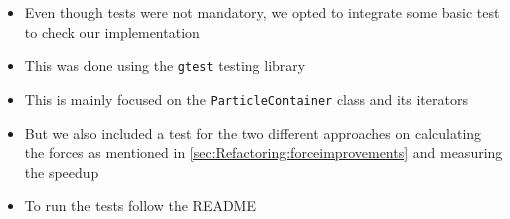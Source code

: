 \documentclass{article}
\begin{document}
\begin{itemize}
    \item Even though tests were not mandatory, we opted to integrate some basic test to check our implementation
    \item This was done using the \verb|gtest| testing library
    \item This is mainly focused on the \verb|ParticleContainer| class and its iterators
    \item But we also included a test for the two different approaches on calculating the forces as mentioned in \ref{sec:Refactoring:forceimprovements} and measuring the speedup
    \item To run the tests follow the README
\end{itemize}
\end{document}
